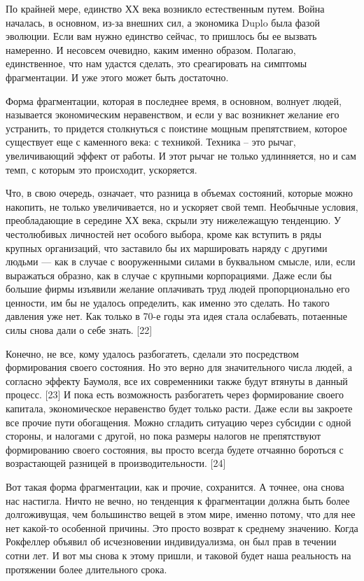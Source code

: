 \documentclass[ebook,12pt,oneside,openany]{memoir}
\begin{document}
По крайней мере, единство ХХ века возникло естественным путем. Война
началась, в основном, из-за внешних сил, а экономика Duplo была фазой
эволюции. Если вам нужно единство сейчас, то пришлось бы ее вызвать
намеренно. И несовсем очевидно, каким именно образом. Полагаю,
единственное, что нам удастся сделать, это среагировать на симптомы
фрагментации. И уже этого может быть достаточно. \newline

Форма фрагментации, которая в последнее время, в основном, волнует
людей, называется экономическим неравенством, и если у вас возникнет
желание его устранить, то придется столкнуться с поистине мощным
препятствием, которое существует еще с каменного века: с техникой.
Техника – это рычаг, увеличивающий эффект от работы. И этот рычаг не
только удлинняется, но и сам темп, с которым это происходит,
ускоряется. \newline

Что, в свою очередь, означает, что разница в объемах состояний,
которые можно накопить, не только увеличивается, но и ускоряет свой
темп. Необычные условия, преобладающие в середине ХХ века, скрыли эту
нижележащую тенденцию. У честолюбивых личностей нет особого выбора,
кроме как вступить в ряды крупных организаций, что заставило бы их
маршировать наряду с другими людьми — как в случае с вооруженными
силами в буквальном смысле, или, если выражаться образно, как в случае
с крупными корпорациями. Даже если бы большие фирмы изъявили желание
оплачивать труд людей пропорционально его ценности, им бы не удалось
определить, как именно это сделать. Но такого давления уже нет. Как
только в 70-е годы эта идея стала ослабевать, потаенные силы снова
дали о себе знать. [22] \newline

Конечно, не все, кому удалось разбогатеть, сделали это посредством
формирования своего состояния. Но это верно для значительного числа
людей, а согласно эффекту Баумоля, все их современники также будут
втянуты в данный процесс. [23] И пока есть возможность разбогатеть
через формирование своего капитала, экономическое неравенство будет
только расти. Даже если вы закроете все прочие пути обогащения. Можно
сгладить ситуацию через субсидии с одной стороны, и налогами с другой,
но пока размеры налогов не препятствуют формированию своего состояния,
вы просто всегда будете отчаянно бороться с возрастающей разницей в
производительности. [24] \newline

Вот такая форма фрагментации, как и прочие, сохранится. А точнее, она
снова нас настигла. Ничто не вечно, но тенденция к фрагментации должна
быть более долгоживущая, чем большинство вещей в этом мире, именно
потому, что для нее нет какой-то особенной причины. Это просто возврат
к среднему значению. Когда Рокфеллер объявил об исчезновении
индивидуализма, он был прав в течении сотни лет. И вот мы снова к
этому пришли, и таковой будет наша реальность на протяжении более
длительного срока. \newline
\end{document}
